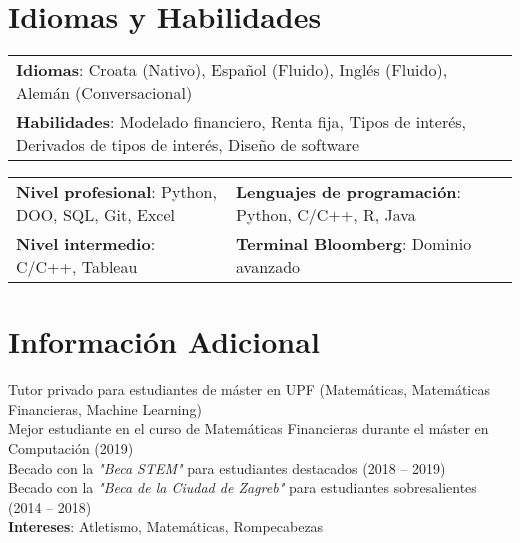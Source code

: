 \documentclass[letterpaper,10pt]{article}
\begin{document}
%
\section{Idiomas y Habilidades}
\begin{center}
\begin{tabularx}{0.96\textwidth} { 
  >{\raggedright\arraybackslash}X
}
  \small{\textbf{Idiomas}: Croata (Nativo), Español (Fluido), Inglés (Fluido), Alemán (Conversacional)}\\
  \small{\textbf{Habilidades}: Modelado financiero, Renta fija, Tipos de interés, Derivados de tipos de interés, Diseño de software}
\end{tabularx}
\end{center}

\begin{center}
\begin{tabularx}{0.96\textwidth} { 
  >{\raggedright\arraybackslash}X 
   >{\raggedright\arraybackslash}X 
   >{\raggedright\arraybackslash}X 
   >{\raggedright\arraybackslash}X
}
\small{\textbf{Nivel profesional}: Python, DOO, SQL, Git, Excel} & \small{\hspace{3pt}\textbf{Lenguajes de programación}: Python, C/C++, R, Java} \\
\small{\textbf{Nivel intermedio}: C/C++, Tableau} & \small{\hspace{3pt}\textbf{Terminal Bloomberg}: Dominio avanzado} \\
\end{tabularx}
\end{center}


\section{Información Adicional}
\begin{itemize}[leftmargin=0.15in, label={}]
  \small{\item{
  	 Tutor privado para estudiantes de máster en UPF (Matemáticas, Matemáticas Financieras, Machine Learning)\\
     Mejor estudiante en el curso de Matemáticas Financieras durante el máster en Computación (2019) \\
     Becado con la \textit{"Beca STEM"} para estudiantes destacados (2018 -- 2019) \\
     Becado con la \textit{"Beca de la Ciudad de Zagreb"} para estudiantes sobresalientes (2014 -- 2018) \\ \vspace{3pt}
     \textbf{Intereses}: Atletismo, Matemáticas, Rompecabezas
    }}
\end{itemize}


\end{document}

